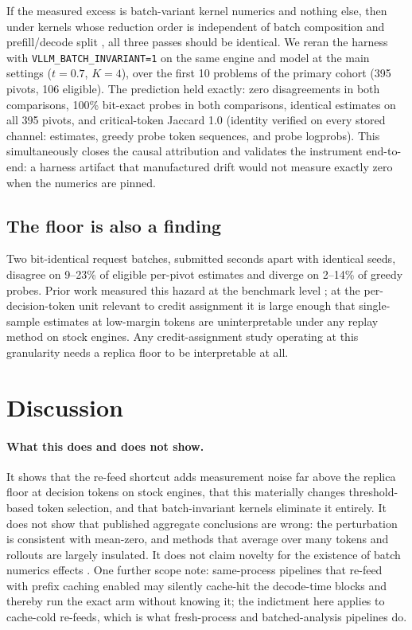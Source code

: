 \documentclass[11pt]{article}
\begin{document}
If the measured excess is batch-variant kernel numerics and nothing else,
then under kernels whose reduction order is independent of batch
composition and prefill/decode split \citep{he2025nondeterminism}, all
three passes should be identical. We reran the harness with
\texttt{VLLM\_BATCH\_INVARIANT=1} on the same engine and model at the main
settings ($t{=}0.7$, $K{=}4$), over the first 10 problems of the primary
cohort (395 pivots, 106 eligible). The prediction held exactly: zero
disagreements in both comparisons, 100\% bit-exact probes in both
comparisons, identical estimates on all 395 pivots, and critical-token
Jaccard 1.0 (identity verified on every stored channel: estimates, greedy
probe token sequences, and probe logprobs). This simultaneously closes the
causal attribution and validates the instrument end-to-end: a harness
artifact that manufactured drift would not measure exactly zero when the
numerics are pinned.

\subsection{The floor is also a finding}

Two bit-identical request batches, submitted seconds apart with identical
seeds, disagree on 9--23\% of eligible per-pivot estimates and diverge on
2--14\% of greedy probes. Prior work measured this hazard at the benchmark
level \citep{yuan2025numerical, song2024greedy}; at the per-decision-token
unit relevant to credit assignment it is large enough that single-sample
estimates at low-margin tokens are uninterpretable under any replay method
on stock engines. Any credit-assignment study operating at this granularity
needs a replica floor to be interpretable at all.

\section{Discussion}

\paragraph{What this does and does not show.} It shows that the re-feed
shortcut adds measurement noise far above the replica floor at decision
tokens on stock engines, that this materially changes threshold-based
token selection, and that batch-invariant kernels eliminate it entirely.
It does not show that published aggregate conclusions are wrong: the
perturbation is consistent with mean-zero, and methods that average over
many tokens and
rollouts are largely insulated. It does not claim novelty for the existence
of batch numerics effects \citep{he2025nondeterminism, yuan2025numerical}.
One further scope note: same-process pipelines that re-feed with prefix
caching enabled may silently cache-hit the decode-time blocks and thereby
run the exact arm without knowing it; the indictment here applies to
cache-cold re-feeds, which is what fresh-process and batched-analysis
pipelines do.
\end{document}
